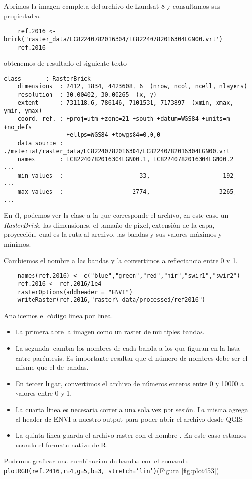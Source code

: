 \begin{exa}
    Abrimos la imagen completa del archivo de Landsat 8 y consultamos sus
    propiedades.
    \begin{lstlisting}
    ref.2016 <- brick("raster_data/LC82240782016304/LC82240782016304LGN00.vrt")
    ref.2016
    \end{lstlisting}
    obtenemos de resultado el siguiente texto
    \begin{Verbatim}[fontsize=\small]
    class       : RasterBrick
    dimensions  : 2412, 1834, 4423608, 6  (nrow, ncol, ncell, nlayers)
    resolution  : 30.00402, 30.00265  (x, y)
    extent      : 731118.6, 786146, 7101531, 7173897  (xmin, xmax, ymin, ymax)
    coord. ref. : +proj=utm +zone=21 +south +datum=WGS84 +units=m +no_defs
                  +ellps=WGS84 +towgs84=0,0,0
    data source : ./material/raster_data/LC82240782016304/LC82240782016304LGN00.vrt
    names       : LC82240782016304LGN00.1, LC82240782016304LGN00.2, ...
    min values  :                     -33,                     192, ...
    max values  :                    2774,                    3265, ...
    \end{Verbatim}
    En \'el, podemos ver la clase a la que corresponde el archivo, en este
    caso un \emph{RasterBrick}, las dimensiones, el tamaño de p\'ixel, extensi\'on
    de la capa, proyecci\'on, cual es la ruta al archivo, las bandas y
    sus valores m\'aximos y m\'inimos.

    Cambiemos el nombre a las bandas y la convertimos a reflectancia entre 0 y 1.

    \begin{lstlisting}
    names(ref.2016) <- c("blue","green","red","nir","swir1","swir2")
    ref.2016 <- ref.2016/1e4
    rasterOptions(addheader = "ENVI")
    writeRaster(ref.2016,"raster\_data/processed/ref2016")
    \end{lstlisting}

    Analicemos el c\'odigo l\'inea por l\'inea.
    \begin{itemize}
    \item La primera abre la imagen como  un raster de m\'ultiples bandas.
    \item La segunda, cambia los nombres de cada banda a los que figuran en la
          lista entre par\'entesis. Es importante resaltar que el n\'umero de nombres
          debe ser el mismo que el de bandas.
    \item En tercer lugar, convertimos el archivo de n\'umeros enteros entre 0 y
          10000 a valores entre 0 y 1.
    \item La cuarta linea es necesaria correrla una sola vez por sesi\'on. La misma
          agrega el header de ENVI a nuestro output para poder abrir el archivo
          desde QGIS
      \item La quinta l\'inea guarda el archivo raster con el nombre 
          . En este caso estamos usando el formato nativo de R.
    \end{itemize}
    Podemos graficar una combinacion de bandas con el comando
    \texttt{plotRGB(ref.2016,r=4,g=5,b=3, stretch='lin')}(Figura \ref{fig:plot453})


\end{exa}
